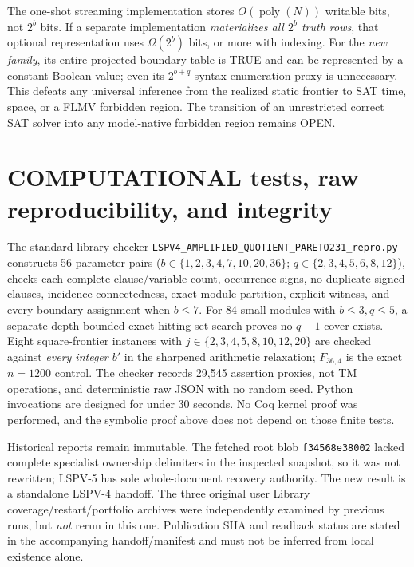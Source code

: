 \documentclass[10.5pt]{article}
\begin{document}
The one-shot streaming implementation stores $O(\operatorname{poly}(N))$ writable bits, not $2^b$ bits. If a separate implementation \emph{materializes all $2^b$ truth rows}, that optional representation uses $\Omega(2^b)$ bits, or more with indexing. For the \emph{new family}, its entire projected boundary table is TRUE and can be represented by a constant Boolean value; even its $2^{b+q}$ syntax-enumeration proxy is unnecessary. This defeats any universal inference from the realized static frontier to SAT time, space, or a FLMV forbidden region. The transition of an unrestricted correct SAT solver into any model-native forbidden region remains OPEN.

\section{COMPUTATIONAL tests, raw reproducibility, and integrity}
The standard-library checker \texttt{LSPV4\_AMPLIFIED\_QUOTIENT\_PARETO231\_repro.py} constructs 56 parameter pairs ($b\in\{1,2,3,4,7,10,20,36\}$; $q\in\{2,3,4,5,6,8,12\}$), checks each complete clause/variable count, occurrence signs, no duplicate signed clauses, incidence connectedness, exact module partition, explicit witness, and every boundary assignment when $b\le7$. For 84 small modules with $b\le3,q\le5$, a separate depth-bounded exact hitting-set search proves no $q-1$ cover exists. Eight square-frontier instances with $j\in\{2,3,4,5,8,10,12,20\}$ are checked against \emph{every integer $b'$} in the sharpened arithmetic relaxation; $F_{36,4}$ is the exact $n=1200$ control. The checker records 29,545 assertion proxies, not TM operations, and deterministic raw JSON with no random seed. Python invocations are designed for under 30 seconds. No Coq kernel proof was performed, and the symbolic proof above does not depend on those finite tests.

Historical reports remain immutable. The fetched root  blob \texttt{f34568e38002} lacked complete specialist ownership delimiters in the inspected snapshot, so it was not rewritten; LSPV-5 has sole whole-document recovery authority. The new result is a standalone LSPV-4 handoff. The three original user Library coverage/restart/portfolio archives were independently examined by previous runs, but \emph{not} rerun in this one. Publication SHA and readback status are stated in the accompanying handoff/manifest and must not be inferred from local existence alone.
\end{document}
